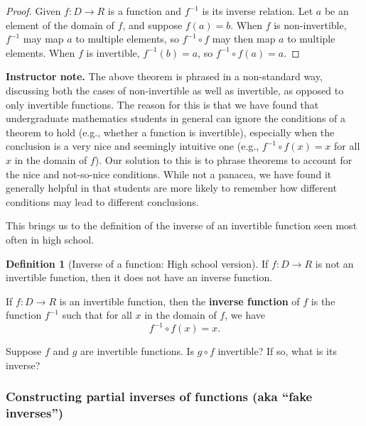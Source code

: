 \documentclass[11pt]{article}
\newcommand\smallnote[1]
	{\begin{mdframed}\raggedright  {\bf Instructor note.} {#1} \end{mdframed}}
\newenvironment{task}
	{\begin{mdframed}[linecolor=lightgray, linewidth=3pt]\raggedright}
	{\end{mdframed}}
\theoremstyle{definition}
\newtheorem{definition}[theorem]{Definition}
\begin{document}
\begin{proof}
Given $f:D\to R$ is a function and $f^{-1}$ is its inverse relation. Let $a$ be an element of the domain of $f$, and suppose $f(a)=b$. When $f$ is non-invertible, $f^{-1}$ may map $a$ to multiple elements, so $f^{-1}\circ f$ may then map $a$ to multiple elements. When $f$ is invertible, $f^{-1}(b)=a$, so $f^{-1}\circ f(a)=a$. 
\end{proof}

\smallnote{The above theorem is phrased in a non-standard way, discussing both the cases of non-invertible as well as invertible, as opposed to only invertible functions. The reason for this is that we have found that undergraduate mathematics students in general can ignore the conditions of a theorem to hold (e.g., whether a function is invertible), especially when the conclusion is a very nice and seemingly intuitive one (e.g., $f^{-1}\circ f(x)=x$ for all $x$ in the domain of $f$). Our solution to this is to phrase theorems to account for the nice and not-so-nice conditions. While not a panacea, we have found it generally helpful in that students are more likely to remember how different conditions may lead to different conclusions.}

This brings us to the definition of the inverse of an invertible function seen most often in high school.

\begin{definition}[Inverse of a function: High school version] \label{d: inverse of a function}
If $f:D\to R$ is not an invertible function, then it does not have an inverse function.

If $f:D\to R$ is an invertible function, then the {\bf inverse function} of $f$ is the function $f^{-1}$ such that for all $x$ in the domain of $f$, we have
	$$f^{-1}\circ f(x)=x.$$
\end{definition}

\begin{task}
Suppose $f$ and $g$ are invertible functions. Is $g\circ f$ invertible? If so, what is its inverse?
\end{task}

\subsubsection{Constructing partial inverses of functions (aka ``fake inverses'')}
\end{document}
